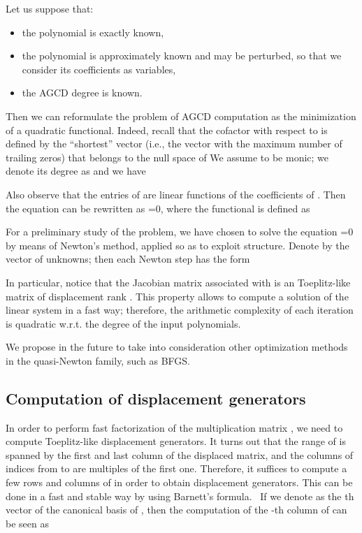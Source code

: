 \documentclass{article}
\newenvironment{itemizedot}{\begin{itemize} \renewcommand{\labelitemi}{}\renewcommand{\labelitemii}{}\renewcommand{\labelitemiii}{}\renewcommand{\labelitemiv}{}}{\end{itemize}}
\begin{document}
Let us suppose that:
\begin{itemizedot}
  \item the polynomial  is exactly known,
  
  \item the polynomial  is approximately known
  and may be perturbed, so that we consider its coefficients as variables,
  
  \item the AGCD degree is known. 
\end{itemizedot}
Then we can reformulate the problem of AGCD computation as the minimization
of a quadratic functional. Indeed, recall that the cofactor  with
respect to  is defined by the ``shortest'' vector (i.e., the vector
with the maximum number of trailing zeros) that belongs to the null space of
 We assume  to be monic; we denote its degree as  and we have

Also observe that the entries of  are linear functions of the
coefficients of . Then the equation  can be rewritten as
=0, where the functional  is defined as

For a preliminary study of the problem, we have chosen to solve the equation
=0 by means of Newton's method, applied so as to exploit
structure. Denote by  the
vector of unknowns; then each Newton step has the form

In particular, notice that the Jacobian matrix associated with 
is an  Toeplitz-like matrix of displacement rank .
This property allows to compute a solution of the linear system  in a fast way; therefore, the arithmetic
complexity of each iteration is quadratic w.r.t. the degree of the input
polynomials.

We propose in the future to take into consideration other optimization methods
in the quasi-Newton family, such as BFGS.

\subsection{Computation of displacement generators}



In order to perform fast factorization of the multiplication matrix , we
need to compute Toeplitz-like displacement generators. It turns out that the
range of  is spanned by the first and last column of the
displaced matrix, and the columns of indices from  to  are multiples
of the first one. Therefore, it suffices to compute a few rows and columns of
 in order to obtain displacement generators. This can be done in a fast
and stable way by using Barnett's formula. \ If we denote as  the th
vector of the canonical basis of , then the computation of
the -th column of can be seen as
\end{document}
